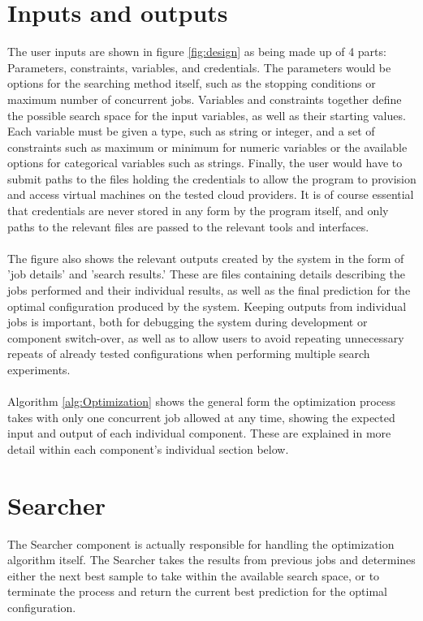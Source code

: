 \documentclass{report}
\begin{document}
\section{Inputs and outputs}
The user inputs are shown in figure \ref{fig:design} as being made up of 4 parts: Parameters, constraints, variables, and credentials. The parameters would be options for the searching method itself, such as the stopping conditions or maximum number of concurrent jobs. Variables and constraints together define the possible search space for the input variables, as well as their starting values. Each variable must be given a type, such as string or integer, and a set of constraints such as maximum or minimum for numeric variables or the available options for categorical variables such as strings. Finally, the user would have to submit paths to the files holding the credentials to allow the program to provision and access virtual machines on the tested cloud providers. It is of course essential that credentials are never stored in any form by the program itself, and only paths to the relevant files are passed to the relevant tools and interfaces.
\paragraph{}
The figure also shows the relevant outputs created by the system in the form of 'job details' and 'search results.' These are files containing details describing the jobs performed and their individual results, as well as the final prediction for the optimal configuration produced by the system. Keeping outputs from individual jobs is important, both for debugging the system during development or component switch-over, as well as to allow users to avoid repeating unnecessary repeats of already tested configurations when performing multiple search experiments.
\paragraph{}
Algorithm \ref{alg:Optimization} shows the general form the optimization process takes with only one concurrent job allowed at any time, showing the expected input and output of each individual component. These are explained in more detail within each component's individual section below.

\section{Searcher}
The Searcher component is actually responsible for handling the optimization algorithm itself. The Searcher takes the results from previous jobs and determines either the next best sample to take within the available search space, or to terminate the process and return the current best prediction for the optimal configuration. 
\end{document}
